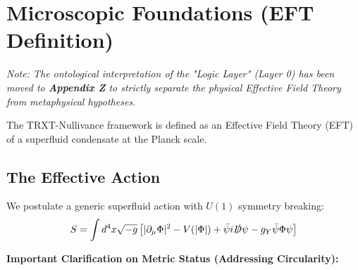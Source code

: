 \documentclass[a4paper,12pt]{article}
\begin{document}
\section{Microscopic Foundations (EFT Definition)}

\textit{Note: The ontological interpretation of the "Logic Layer" (Layer 0) has been moved to \textbf{Appendix Z} to strictly separate the physical Effective Field Theory from metaphysical hypotheses.}

The TRXT-Nullivance framework is defined as an Effective Field Theory (EFT) of a superfluid condensate at the Planck scale.
\subsection{The Effective Action}
We postulate a generic superfluid action with $U(1)$ symmetry breaking:
\begin{equation}
    S = \int d^4x \sqrt{-g} \left[ |\partial_\mu \Phi|^2 - V(|\Phi|) + \bar{\psi} i \slashed{D} \psi - g_Y \bar{\psi} \Phi \psi \right]
\end{equation}

\textbf{Important Clarification on Metric Status (Addressing Circularity):}
\end{document}
